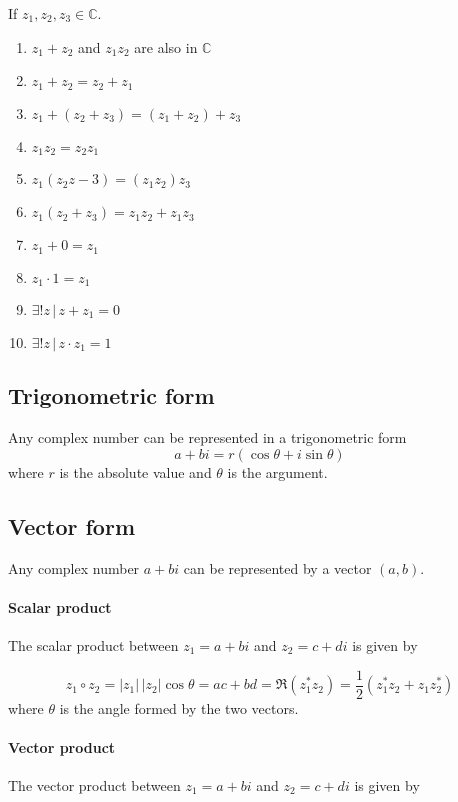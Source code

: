 \documentclass{article}
\begin{document}
If \(z_1, z_2, z_3 \in \mathbb{C}\).
\begin{enumerate}
    \item \(z_1+z_2\) and \(z_1z_2\) are also in \(\mathbb{C}\)
    \item \(z_1+z_2=z_2+z_1\)
    \item \(z_1 + (z_2 + z_3) = (z_1 + z_2) + z_3\)
    \item \(z_1z_2=z_2z_1\)
    \item \(z_1(z_2z-3)=(z_1z_2)z_3\)
    \item \(z_1(z_2+z_3)=z_1z_2+z_1z_3\)
    \item \(z_1+0=z_1\)
    \item \(z_1\cdot 1=z_1\)
    \item \(\exists ! z \,|\, z+z_1=0\)
    \item \(\exists ! z \,|\, z\cdot z_1=1\)
\end{enumerate}

\subsection{Trigonometric form}

Any complex number can be represented in a trigonometric form
\[
    a+bi=r(\cos\theta+i\sin\theta)
\]
where \(r\) is the absolute value and \(\theta\) is the argument.

\subsection{Vector form}

Any complex number \(a+bi\) can be represented by a vector \((a,b)\).

\paragraph{Scalar product}

The scalar product between \(z_1=a+bi\) and \(z_2=c+di\) is given by

\[
    z_1\circ z_2 = |z_1|\,|z_2|\cos\theta
    = ac+bd = \Re(z_1^*z_2) = \frac{1}{2}(z_1^*z_2+z_1z_2^*)
\]
where \(\theta\) is the angle formed by the two vectors.

\paragraph{Vector product}

The vector product between \(z_1=a+bi\) and \(z_2=c+di\) is given by
\end{document}
